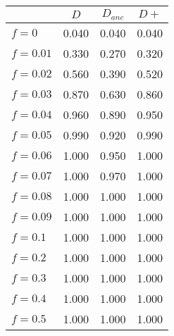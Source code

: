 \begin{tabular}{lccc}
\toprule
 & $D$ & $D_{anc}$ & $D+$ \\
\midrule
$f = 0$ & 0.040 & 0.040 & 0.040 \\
$f = 0.01$ & 0.330 & 0.270 & 0.320 \\
$f = 0.02$ & 0.560 & 0.390 & 0.520 \\
$f = 0.03$ & 0.870 & 0.630 & 0.860 \\
$f = 0.04$ & 0.960 & 0.890 & 0.950 \\
$f = 0.05$ & 0.990 & 0.920 & 0.990 \\
$f = 0.06$ & 1.000 & 0.950 & 1.000 \\
$f = 0.07$ & 1.000 & 0.970 & 1.000 \\
$f = 0.08$ & 1.000 & 1.000 & 1.000 \\
$f = 0.09$ & 1.000 & 1.000 & 1.000 \\
$f = 0.1$ & 1.000 & 1.000 & 1.000 \\
$f = 0.2$ & 1.000 & 1.000 & 1.000 \\
$f = 0.3$ & 1.000 & 1.000 & 1.000 \\
$f = 0.4$ & 1.000 & 1.000 & 1.000 \\
$f = 0.5$ & 1.000 & 1.000 & 1.000 \\
\bottomrule
\end{tabular}
